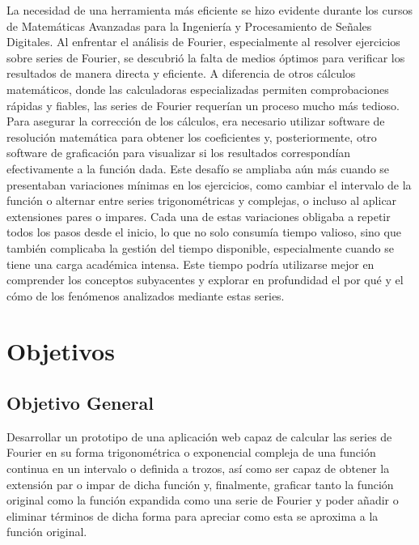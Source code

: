 La necesidad de una herramienta más eficiente se hizo evidente durante los cursos de Matemáticas Avanzadas para la Ingeniería y Procesamiento de Señales Digitales. Al enfrentar el análisis de Fourier, especialmente al resolver ejercicios sobre series de Fourier, se descubrió la falta de medios óptimos para verificar los resultados de manera directa y eficiente. A diferencia de otros cálculos matemáticos, donde las calculadoras especializadas permiten comprobaciones rápidas y fiables, las series de Fourier requerían un proceso mucho más tedioso. Para asegurar la corrección de los cálculos, era necesario utilizar software de resolución matemática para obtener los coeficientes y, posteriormente, otro software de graficación para visualizar si los resultados correspondían efectivamente a la función dada. Este desafío se ampliaba aún más cuando se presentaban variaciones mínimas en los ejercicios, como cambiar el intervalo de la función o alternar entre series trigonométricas y complejas, o incluso al aplicar extensiones pares o impares. Cada una de estas variaciones obligaba a repetir todos los pasos desde el inicio, lo que no solo consumía tiempo valioso, sino que también complicaba la gestión del tiempo disponible, especialmente cuando se tiene una carga académica intensa. Este tiempo podría utilizarse mejor en comprender los conceptos subyacentes y explorar en profundidad el por qué y el cómo de los fenómenos analizados mediante estas series.

\section{Objetivos}
\subsection{Objetivo General}
Desarrollar un prototipo de una aplicación web capaz de calcular las series de Fourier en su forma trigonométrica o exponencial compleja de una función continua en un intervalo o definida a trozos, así como ser capaz de obtener la extensión par o impar de dicha función y, finalmente, graficar tanto la función original como la función expandida como una serie de Fourier y poder añadir o eliminar términos de dicha forma para apreciar como esta se aproxima a la función original.

